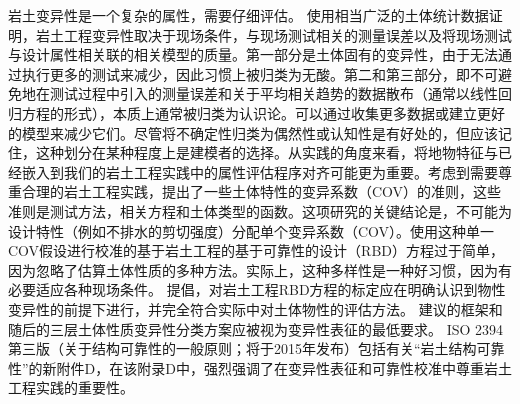 \begin{paracol}{2}
\begin{Parallel}{0.60\textwidth}{}
{    }
    \ParallelRText
    {
        岩土变异性是一个复杂的属性，需要仔细评估。 \citet{Phoon1999612}使用相当广泛的土体统计数据证明，岩土工程变异性取决于现场条件，与现场测试相关的测量误差以及将现场测试与设计属性相关联的相关模型的质量。第一部分是土体固有的变异性，由于无法通过执行更多的测试来减少，因此习惯上被归类为无酸。第二和第三部分，即不可避免地在测试过程中引入的测量误差和关于平均相关趋势的数据散布（通常以线性回归方程的形式），本质上通常被归类为认识论。可以通过收集更多数据或建立更好的模型来减少它们。尽管将不确定性归类为偶然性或认知性是有好处的，但应该记住，这种划分在某种程度上是建模者的选择\citep{DerKiureghian2007}。从实践的角度来看，将地物特征与已经嵌入到我们的岩土工程实践中的属性评估程序对齐可能更为重要。考虑到需要尊重合理的岩土工程实践，\citet{Phoon1999625}提出了一些土体特性的变异系数（COV）的准则，这些准则是测试方法，相关方程和土体类型的函数。这项研究的关键结论是，不可能为设计特性（例如不排水的剪切强度）分配单个变异系数（COV）。使用这种单一COV假设进行校准的基于岩土工程的基于可靠性的设计（RBD）方程过于简单，因为忽略了估算土体性质的多种方法。实际上，这种多样性是一种好习惯，因为有必要适应各种现场条件。 \citet{Phoon1999612,Phoon1999625}提倡，对岩土工程RBD方程的标定应在明确认识到物性变异性的前提下进行，并完全符合实际中对土体物性的评估方法。 \citet{Phoon1999612,Phoon1999625}建议的框架和随后的三层土体性质变异性分类方案\citep{Phoon2008344}应被视为变异性表征的最低要求。 ISO 2394第三版（关于结构可靠性的一般原则；将于2015年发布）包括有关“岩土结构可靠性”的新附件D，在该附录D中，强烈强调了在变异性表征和可靠性校准中尊重岩土工程实践的重要性。
    }
    \ParallelPar
    \ParallelLText
    {
}
\end{Parallel}
\end{paracol}
